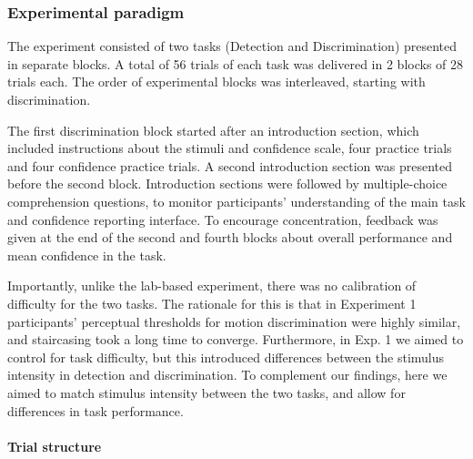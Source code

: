 \documentclass[12pt,twoside]{reedthesis}
\begin{document}
\hypertarget{experimental-paradigm}{%
\subsubsection{Experimental paradigm}\label{experimental-paradigm}}

The experiment consisted of two tasks (Detection and Discrimination) presented in separate blocks. A total of 56 trials of each task was delivered in 2 blocks of 28 trials each. The order of experimental blocks was interleaved, starting with discrimination.

The first discrimination block started after an introduction section, which included instructions about the stimuli and confidence scale, four practice trials and four confidence practice trials. A second introduction section was presented before the second block. Introduction sections were followed by multiple-choice comprehension questions, to monitor participants' understanding of the main task and confidence reporting interface. To encourage concentration, feedback was given at the end of the second and fourth blocks about overall performance and mean confidence in the task.

Importantly, unlike the lab-based experiment, there was no calibration of difficulty for the two tasks. The rationale for this is that in Experiment 1 participants' perceptual thresholds for motion discrimination were highly similar, and staircasing took a long time to converge. Furthermore, in Exp. 1 we aimed to control for task difficulty, but this introduced differences between the stimulus intensity in detection and discrimination. To complement our findings, here we aimed to match stimulus intensity between the two tasks, and allow for differences in task performance.

\hypertarget{trial-structure}{%
\paragraph{Trial structure}\label{trial-structure}}
\end{document}
